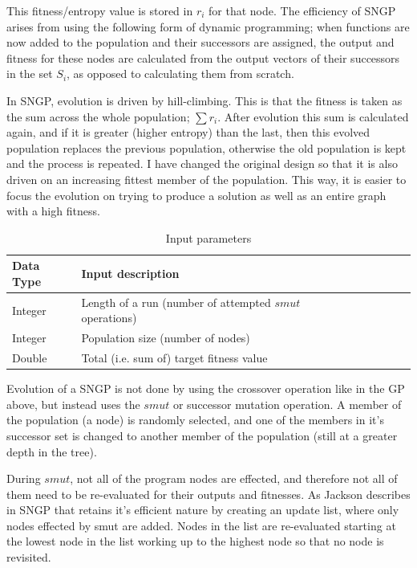 \documentclass[a4paper,10.5pt]{article}
\begin{document}
This fitness/entropy value is stored in $r_i$ for that node. The efficiency of SNGP arises from using the following form of dynamic programming; when functions are now added to the population and their successors are assigned, the output and fitness for these nodes are calculated from the output vectors of their successors in the set $S_i$, as opposed to calculating them from scratch.

In SNGP, evolution is driven by hill-climbing. This is that the fitness is taken as the sum across the whole population; $\sum r_i$. After evolution this sum is calculated again, and if it is greater (higher entropy) than the last, then this evolved population replaces the previous population, otherwise the old population is kept and the process is repeated. I have changed the original design so that it is also driven on an increasing fittest member of the population. This way, it is easier to focus the evolution on trying to produce a solution as well as an entire graph with a high fitness. 

\begin{table}[H]
\centering
\caption{Input parameters}
\label{inputparamsngp}
\begin{tabular}{l*{6}{l}r}
Data Type             & Input description\\
\hline
Integer & Length of a run (number of attempted $smut$ operations)\\
Integer & Population size (number of nodes)\\
Double & Total (i.e. sum of) target fitness value\\
\end{tabular}
\end{table}

Evolution of a SNGP is not done by using the crossover operation like in the GP above, but instead uses the $smut$ or successor mutation operation. A member of the population (a node) is randomly selected, and one of the members in it's successor set is changed to another member of the population (still at a greater depth in the tree). 

During $smut$, not all of the program nodes are effected, and therefore not all of them need to be re-evaluated for their outputs and fitnesses. As Jackson describes in \cite[p.53]{jacksonsngp} SNGP that retains it's efficient nature by creating an update list, where only nodes effected by smut are added. Nodes in the list are re-evaluated starting at the lowest node in the list working up to the highest node so that no node is revisited.
\end{document}
